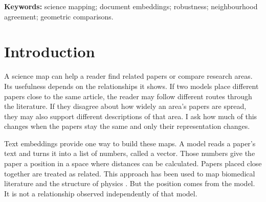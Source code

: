 \begin{abstract}
Science maps use relationships between papers to describe how research is organised. When these relationships come from text embeddings, a model turns each paper into a list of numbers. Would another model give the same picture? I compare ten models using the same collection of 500,000 OpenAlex records, covering 26 research fields and 2000--2024. I examine the overall arrangement, the papers placed closest to each other, and the spread of papers within fields. The models share a broad arrangement, but in searches within the same field and period, two models retain about eight of the same 25 closest papers on average. Using only the title instead of the title and abstract changes these neighbours about as much as changing models. In a later exploratory comparison, models also disagree about which of two fields has more widely spread paper representations. These opposite results can persist when different articles are selected, although many differences are small and processing choices matter. Repeating a result with other articles therefore does not ensure that another model supports it. The findings identify dependence on representation; they do not establish which model best describes the research itself.
\end{abstract}
\textbf{Keywords:} science mapping; document embeddings; robustness; neighbourhood agreement; geometric comparisons.

\section{Introduction}
A science map can help a reader find related papers or compare research areas. Its usefulness depends on the relationships it shows. If two models place different papers close to the same article, the reader may follow different routes through the literature. If they disagree about how widely an area's papers are spread, they may also support different descriptions of that area. I ask how much of this changes when the papers stay the same and only their representation changes.

Text embeddings provide one way to build these maps. A model reads a paper's text and turns it into a list of numbers, called a vector. Those numbers give the paper a position in a space where distances can be calculated. Papers placed close together are treated as related. This approach has been used to map biomedical literature and the structure of physics \citep{refbe130e2973,refc0e2cc29e0}. But the position comes from the model. It is not a relationship observed independently of that model.

